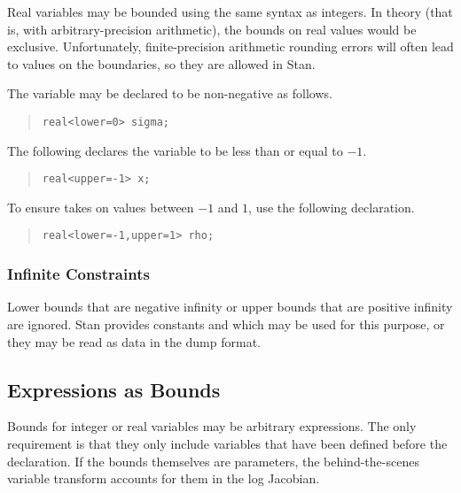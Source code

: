 Real variables may be bounded using the same syntax as integers.  In
theory (that is, with arbitrary-precision arithmetic), the bounds on
real values would be exclusive.  Unfortunately, finite-precision
arithmetic rounding errors will often lead to values on the
boundaries, so they are allowed in Stan.
 
The variable  may be declared to be non-negative as follows.
%
\begin{quote}
\begin{Verbatim}
real<lower=0> sigma;
\end{Verbatim}
\end{quote}
%
The following declares the variable  to be less than or equal
to $-1$.
%
\begin{quote}
\begin{Verbatim} 
real<upper=-1> x;
\end{Verbatim}
\end{quote}
% 
To ensure  takes on values between $-1$ and $1$, use the
following declaration.
%
\begin{quote}
\begin{Verbatim}
real<lower=-1,upper=1> rho;
\end{Verbatim}
\end{quote}
%

\subsubsection{Infinite Constraints}

Lower bounds that are negative infinity or upper bounds that are
positive infinity are ignored.  Stan provides constants
 and  which may
be used for this purpose, or they may be read as data in the dump
format.  


\subsection{Expressions as Bounds}

Bounds for integer or real variables may be arbitrary expressions.
The only requirement is that they only include variables that have
been defined before the declaration.  If the bounds themselves are
parameters, the behind-the-scenes variable transform accounts for them
in the log Jacobian.  

